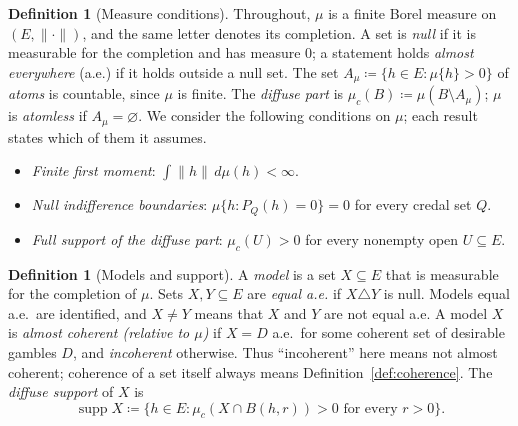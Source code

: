 \documentclass[11pt]{article}
\theoremstyle{definition}
\newtheorem{definition}[theorem]{Definition}
\DeclareMathOperator{\supp}{supp}
\begin{document}
\begin{definition}[Measure conditions]\label{def:measure}
Throughout, $\mu$ is a finite Borel measure on $(E,\|\cdot\|)$, and the same letter denotes its completion. A set is \emph{null} if it is measurable for the completion and has measure $0$; a statement holds \emph{almost everywhere} (a.e.) if it holds outside a null set. The set $A_\mu\coloneqq\{h\in E:\mu\{h\}>0\}$ of \emph{atoms} is countable, since $\mu$ is finite. The \emph{diffuse part} is $\mu_c(B)\coloneqq\mu(B\setminus A_\mu)$; $\mu$ is \emph{atomless} if $A_\mu=\varnothing$. We consider the following conditions on $\mu$; each result states which of them it assumes.
\begin{itemize}[leftmargin=3em]
\item[(M1)] \emph{Finite first moment}: $\int\|h\|\,d\mu(h)<\infty$.
\item[(M2)] \emph{Null indifference boundaries}: $\mu\{h:P_Q(h)=0\}=0$ for every credal set $Q$.
\item[(M3)] \emph{Full support of the diffuse part}: $\mu_c(U)>0$ for every nonempty open $U\subseteq E$.
\end{itemize}
\end{definition}

\begin{definition}[Models and support]\label{def:models}
A \emph{model} is a set $X\subseteq E$ that is measurable for the completion of $\mu$. Sets $X,Y\subseteq E$ are \emph{equal a.e.} if $X\triangle Y$ is null. Models equal a.e.\ are identified, and $X\ne Y$ means that $X$ and $Y$ are not equal a.e. A model $X$ is \emph{almost coherent (relative to $\mu$)} if $X=D$ a.e.\ for some coherent set of desirable gambles $D$, and \emph{incoherent} otherwise. Thus ``incoherent'' here means not almost coherent; coherence of a set itself always means Definition~\ref{def:coherence}. The \emph{diffuse support} of $X$ is
\[
\supp X\coloneqq\{h\in E:\mu_c(X\cap B(h,r))>0\text{ for every }r>0\}.
\]
\end{definition}
\end{document}

